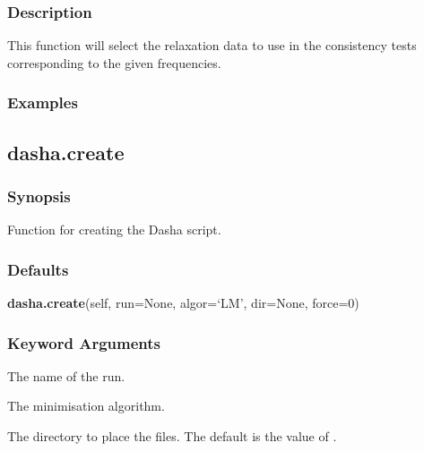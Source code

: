   
 \subsubsection{Description} 

 This function will select the relaxation data to use in the consistency tests corresponding to the given frequencies. 
  

  
 \subsubsection{Examples} 



  

 \newpage 

 \subsection{dasha.create} 

  
 \subsubsection{Synopsis} 

 Function for creating the Dasha script. 
  

  
 \subsubsection{Defaults} 

 \textsf{\textbf{dasha.create}(self, run=None, algor=`LM', dir=None, force=0)} 

  
 \subsubsection{Keyword Arguments} 

   The name of the run.   

   The minimisation algorithm.   

   The directory to place the files.  The default is the value of .   


